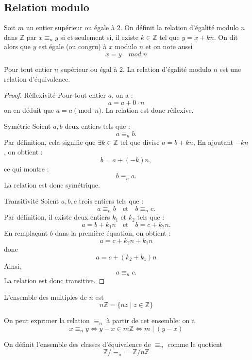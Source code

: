 \subsection{Relation modulo}


\begin{definition}
Soit $m$ un entier supérieur ou égale à $2$. On définit la relation d'égalité modulo $n$ dans $\mathbb{Z}$ par $x\equiv _n y$ si et seulement si, il existe $k\in \mathbb{Z}$ tel que $y=x+kn$. On dit alors que $y$ est égale (ou congru) à $x$ modulo $n$ et on note aussi \[x=y \quad mod \; n\]
\end{definition}

\begin{proposition}
    Pour tout entier $n$ supérieur ou égal à $2$, La relation d'égalité modulo $n$ est une relation d'équivalence.
\end{proposition}

\begin{proof}

Réflexivité
Pour tout entier $a$, on a :
\[
a = a +0\cdot n
\]
on en déduit que $a= a \pmod{n}$. 
La relation est donc réflexive.

Symétrie
Soient $a, b$ deux entiers tels que :
\[
a \equiv_n b.
\]
Par définition, cela signifie que $\exists k \in \mathbb{Z}$ tel que divise $a=b+kn$,
En ajoutant $-kn$, on obtient :
\[
b =a+ (-k)n,
\]
ce qui montre :
\[
b \equiv_n a .
\]
La relation est donc symétrique.

Transitivité
Soient $a, b, c$ trois entiers tels que :
\[
a \equiv_n b \quad \text{et} \quad b \equiv_n c .
\]
Par définition, il existe deux entiers $k_1$ et $k_2$ tels que :
\[
a  =b+ k_1 n \quad \text{et} \quad b =c+ k_2 n.
\]
En remplaçant $b$ dans la première équation, on obtient :
\[
a=c+k_2n+k_1n
\]
donc
\[
a= c+(k_2+k_1)n
\]
Ainsi,
\[
a \equiv_n c.
\]
La relation est donc transitive.
\end{proof}

\begin{notation}
    L'ensemble des multiples de $n$ est
    \[
    n\mathbb{Z}=\{nz\mid z\in \mathbb{Z}\}
    \]
\end{notation}

\begin{remarque}
On peut exprimer la relation $\equiv_n$ à partir de cet ensemble: on a 
\[
x\equiv_ny \Leftrightarrow y-x \in m\mathbb{Z}\Leftrightarrow m\mid (y-x)
\]
\end{remarque}

\begin{notation}
     On définit l'ensemble des classes d'équivalence de $\equiv_n$ comme le quotient
    \[
    \mathbb{Z}/\equiv_n=\mathbb{Z}/n\mathbb{Z}
    \]
\end{notation}

